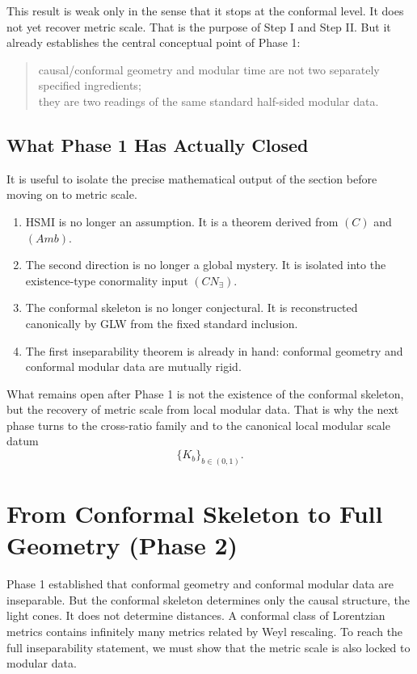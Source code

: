 \documentclass[12pt]{article}
\theoremstyle{definition}
\theoremstyle{remark}
\newcommand{\tightlist}{%
  \setlength{\itemsep}{0pt}\setlength{\parskip}{0pt}}
\begin{document}
This result is weak only in the sense that it stops at the conformal
level. It does not yet recover metric scale. That is the purpose of Step
I and Step II\@. But it already establishes the central conceptual point
of Phase 1:

\begin{quote}
causal/conformal geometry and modular time are not two separately
specified ingredients;\\
they are two readings of the same standard half-sided modular data.
\end{quote}

\subsection{What Phase 1 Has Actually
Closed}\label{what-phase-1-has-actually-closed}

It is useful to isolate the precise mathematical output of the section
before moving on to metric scale.

\begin{enumerate}
\def\labelenumi{\arabic{enumi}.}
\tightlist
\item
  HSMI is no longer an assumption. It is a theorem derived from \((C)\)
  and \((Amb)\).
\item
  The second direction is no longer a global mystery. It is isolated
  into the existence-type conormality input \((CN_\exists)\).
\item
  The conformal skeleton is no longer conjectural. It is reconstructed
  canonically by GLW from the fixed standard inclusion.
\item
  The first inseparability theorem is already in hand: conformal
  geometry and conformal modular data are mutually rigid.
\end{enumerate}

What remains open after Phase 1 is not the existence of the conformal
skeleton, but the recovery of metric scale from local modular data. That
is why the next phase turns to the cross-ratio family and to the
canonical local modular scale datum \[
\{K_b\}_{b\in(0,1)}.
\]

\section{From Conformal Skeleton to Full Geometry (Phase
2)}\label{from-conformal-skeleton-to-full-geometry-phase-2}

Phase 1 established that conformal geometry and conformal modular data
are inseparable. But the conformal skeleton determines only the causal
structure, the light cones. It does not determine distances. A conformal
class of Lorentzian metrics contains infinitely many metrics related by
Weyl rescaling. To reach the full inseparability statement, we must show
that the metric scale is also locked to modular data.
\end{document}
